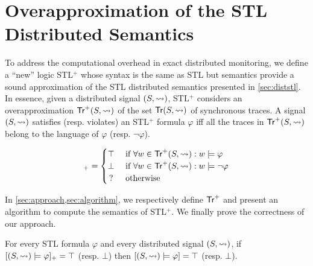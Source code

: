\section{Overapproximation of the STL Distributed Semantics}
To address the computational overhead in exact distributed monitoring, we define a ``new'' logic  STL$^+$ whose syntax is the same as STL but semantics provide a sound approximation of the STL distributed semantics presented in \cref{sec:diststl}.
In essence, given a distributed signal $(S,{\rightsquigarrow})$, STL$^+$ considers an overapproximation $\mathsf{Tr}^+(S,{\rightsquigarrow})$ of the set $\mathsf{Tr}(S,{\rightsquigarrow})$ of synchronous traces.
A signal $(S,{\rightsquigarrow})$ satisfies (resp. violates) an STL$^+$ formula $\varphi$ iff all the traces in $\mathsf{Tr}^+(S,{\rightsquigarrow})$ belong to the language of $\varphi$ (resp. $\lnot \varphi$).

\small
\begin{equation*}
	[(S,{\hb}) \models \varphi]_+ = 
	\begin{cases}
		\top & \text{ if } \forall w \in \tr^+(S,{\hb}) : w \models \varphi \\
		\bot & \text{ if } \forall w \in \tr^+(S,{\hb}) : w \models \lnot\varphi \\
		\,? & \text{ otherwise}
	\end{cases}
\end{equation*}
\normalsize

In \cref{sec:approach,sec:algorithm}, we respectively define $\mathsf{Tr}^+$ and present an algorithm to compute the semantics of STL$^+$.
We finally prove the correctness of our approach.

\begin{theorem} \label{cl:stlsound}
	For every STL formula $\varphi$ and every distributed signal $(S,{\rightsquigarrow})$, if $[(S,{\rightsquigarrow}) \models \varphi]_+ = \top$ (resp. $\bot$) then $[(S,{\rightsquigarrow}) \models \varphi] = \top$ (resp. $\bot$).
\end{theorem}
